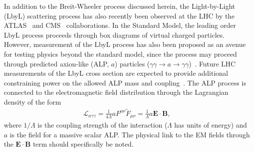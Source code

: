\documentclass[12pt,epjc3]{svjour3}\sloppy
\begin{document}
In addition to the Breit-Wheeler process discussed herein, the Light-by-Light (LbyL) scattering process has also recently been observed at the LHC by the ATLAS~\cite{aaboudEvidenceLightbylightScattering2017b,atlascollaborationObservationLightbyLightScattering2019b} and CMS~\cite{sirunyanEvidenceLightbylightScattering2019a} collaborations. In the Standard Model, the leading order LbyL process proceeds through box diagrams of virtual charged particles. However, measurement of the LbyL process has also been proposed as an avenue for testing physics beyond the standard model, since the process may proceed through predicted axion-like (ALP, $a$) particles ($\gamma\gamma \rightarrow a \rightarrow \gamma\gamma$)~\cite{bauerColliderProbesAxionlike2017}. Future LHC measurements of the LbyL cross section are expected to provide additional constraining power on the allowed ALP mass and coupling~\cite{ProspectsMeasurementsPhotonInduced}. The ALP process is connected to the electromagnetic field distribution through the Lagrangian density of the form~\cite{bauerColliderProbesAxionlike2017}
\begin{align}
  \mathcal{L}_{a\gamma\gamma} = \frac{1}{4\Lambda}a F^{\mu\nu}\tilde{F}_{\mu\nu} = \frac{1}{\Lambda}a \bm{E}\cdot\bm{B},
\end{align}
where $1/\Lambda$ is the coupling strength of the interaction ($\Lambda$ has units of energy) and $a$ is the field for a massive scalar ALP. The physical link to the EM fields through the $\bm{E}\cdot\bm{B}$ term should specifically be noted. 
\end{document}
